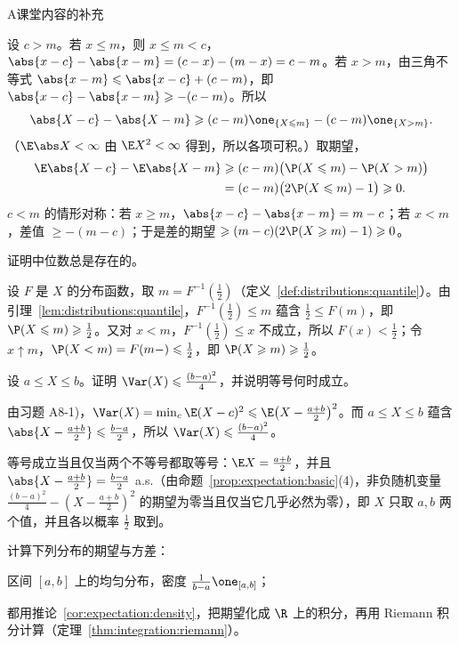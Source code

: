 \begin{exercises}{A}{课堂内容的补充}
\begin{questions}
\begin{solution}
设 $c>m$。若 $x\leqslant m$，则 $x\leqslant m<c$，$\abs{x-c}-\abs{x-m}=(c-x)-(m-x)=c-m$。若 $x>m$，由三角不等式 $\abs{x-m}\leqslant\abs{x-c}+(c-m)$，即 $\abs{x-c}-\abs{x-m}\geqslant-(c-m)$。所以
\[
\abs{X-c}-\abs{X-m}\geqslant(c-m)\one_{\{X\leqslant m\}}-(c-m)\one_{\{X>m\}}.
\]
（$\E\abs X<\infty$ 由 $\E X^2<\infty$ 得到，所以各项可积。）取期望，
\[
\begin{aligned}
\E\abs{X-c}-\E\abs{X-m}&\geqslant(c-m)\bigl(\P(X\leqslant m)-\P(X>m)\bigr)\\
&=(c-m)\bigl(2\P(X\leqslant m)-1\bigr)\geqslant0 .
\end{aligned}
\]
$c<m$ 的情形对称：若 $x\geqslant m$，$\abs{x-c}-\abs{x-m}=m-c$；若 $x<m$，差值 $\geqslant-(m-c)$；于是差的期望 $\geqslant(m-c)(2\P(X\geqslant m)-1)\geqslant0$。
\end{solution}
\item 证明中位数总是存在的。
\begin{solution}
设 $F$ 是 $X$ 的分布函数，取 $m=F^{-1}(\frac12)$（定义~\ref{def:distributions:quantile}）。由引理~\ref{lem:distributions:quantile}，$F^{-1}(\frac12)\leqslant m$ 蕴含 $\frac12\leqslant F(m)$，即 $\P(X\leqslant m)\geqslant\frac12$。又对 $x<m$，$F^{-1}(\frac12)\leqslant x$ 不成立，所以 $F(x)<\frac12$；令 $x\uparrow m$，$\P(X<m)=F(m-)\leqslant\frac12$，即 $\P(X\geqslant m)\geqslant\frac12$。
\end{solution}
\end{questions}

\item\label{ex:expectation:A9} 设 $a\leqslant X\leqslant b$。证明 $\Var(X)\leqslant\frac{(b-a)^2}4$，并说明等号何时成立。
\begin{solution}
由习题 A8-1)，$\Var(X)=\min_c\E(X-c)^2\leqslant \E\bigl(X-\frac{a+b}2\bigr)^2$。而 $a\leqslant X\leqslant b$ 蕴含 $\abs{X-\frac{a+b}2}\leqslant\frac{b-a}2$，所以 $\Var(X)\leqslant\frac{(b-a)^2}4$。

等号成立当且仅当两个不等号都取等号：$\E X=\frac{a+b}2$，并且 $\abs{X-\frac{a+b}2}=\frac{b-a}2$ a.s.（由命题~\ref{prop:expectation:basic}(4)，非负随机变量 $\frac{(b-a)^2}4-(X-\frac{a+b}2)^2$ 的期望为零当且仅当它几乎必然为零），即 $X$ 只取 $a,b$ 两个值，并且各以概率 $\frac12$ 取到。
\end{solution}

\item\label{ex:expectation:A10} 计算下列分布的期望与方差：
\begin{questions}
\item 区间 $[a,b]$ 上的均匀分布，密度 $\frac1{b-a}\one_{[a,b]}$；
\begin{solution}
都用推论~\ref{cor:expectation:density}，把期望化成 $\R$ 上的积分，再用 Riemann 积分计算（定理~\ref{thm:integration:riemann}）。


\end{solution}
\end{questions}
\end{exercises}

